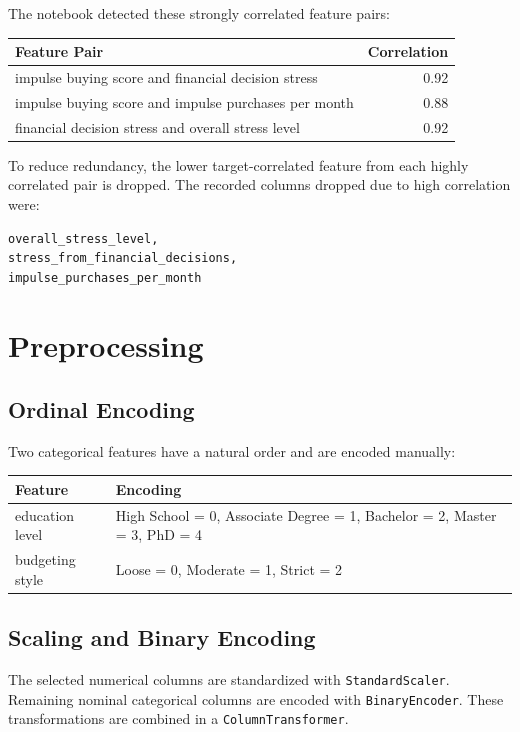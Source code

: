 \documentclass[11pt,a4paper]{article}
\begin{document}
The notebook detected these strongly correlated feature pairs:
\begin{center}
\begin{tabular}{p{}r}
\toprule
Feature Pair & Correlation \\
\midrule
impulse buying score and financial decision stress & 0.92 \\
impulse buying score and impulse purchases per month & 0.88 \\
financial decision stress and overall stress level & 0.92 \\
\bottomrule
\end{tabular}
\end{center}

To reduce redundancy, the lower target-correlated feature from each highly correlated pair is dropped. The recorded columns dropped due to high correlation were:
\begin{verbatim}
overall_stress_level,
stress_from_financial_decisions,
impulse_purchases_per_month
\end{verbatim}

\section{Preprocessing}

\subsection{Ordinal Encoding}

Two categorical features have a natural order and are encoded manually:
\begin{center}
\begin{tabular}{p{}p{}}
\toprule
Feature & Encoding \\
\midrule
education level & High School = 0, Associate Degree = 1, Bachelor = 2, Master = 3, PhD = 4 \\
budgeting style & Loose = 0, Moderate = 1, Strict = 2 \\
\bottomrule
\end{tabular}
\end{center}

\subsection{Scaling and Binary Encoding}

The selected numerical columns are standardized with \texttt{StandardScaler}. Remaining nominal categorical columns are encoded with \texttt{BinaryEncoder}. These transformations are combined in a \texttt{ColumnTransformer}.
\end{document}
